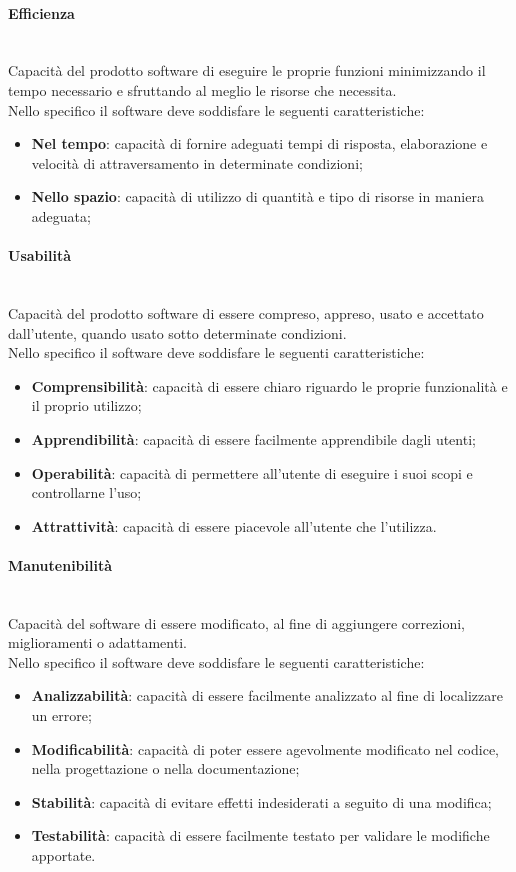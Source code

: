 		\paragraph{Efficienza}\leavevmode \\
		Capacità del prodotto software di eseguire le proprie funzioni minimizzando il tempo necessario e sfruttando al meglio le risorse che necessita.\\
		Nello specifico il software deve soddisfare le seguenti caratteristiche:
		\begin{itemize}
			\item \textbf{Nel tempo}: capacità di fornire adeguati tempi di risposta, elaborazione e velocità di attraversamento in determinate condizioni;
			\item \textbf{Nello spazio}: capacità di utilizzo di quantità e tipo di risorse in maniera adeguata;
		\end{itemize}
		\paragraph{Usabilità}\leavevmode \\
		Capacità del prodotto software di essere compreso, appreso, usato e accettato dall'utente, quando usato sotto determinate condizioni.\\
		Nello specifico il software deve soddisfare le seguenti caratteristiche:
		\begin{itemize}
			\item \textbf{Comprensibilità}: capacità di essere chiaro riguardo le proprie funzionalità e il proprio utilizzo;
			\item \textbf{Apprendibilità}: capacità di essere facilmente apprendibile dagli utenti;
			\item \textbf{Operabilità}: capacità di permettere all'utente di eseguire i suoi scopi e controllarne l'uso;
			\item \textbf{Attrattività}: capacità di essere piacevole all'utente che l'utilizza.
		\end{itemize}
		\paragraph{Manutenibilità}\leavevmode \\
		Capacità del software di essere modificato, al fine di aggiungere correzioni, miglioramenti o adattamenti.\\
		Nello specifico il software deve soddisfare le seguenti caratteristiche:
		\begin{itemize}
			\item \textbf{Analizzabilità}: capacità di essere facilmente analizzato al fine di localizzare un errore;
			\item \textbf{Modificabilità}: capacità di poter essere agevolmente modificato nel codice, nella progettazione o nella documentazione;
			\item \textbf{Stabilità}: capacità di evitare effetti indesiderati a seguito di una modifica;
			\item \textbf{Testabilità}: capacità di essere facilmente testato per validare le modifiche apportate.
		\end{itemize}
